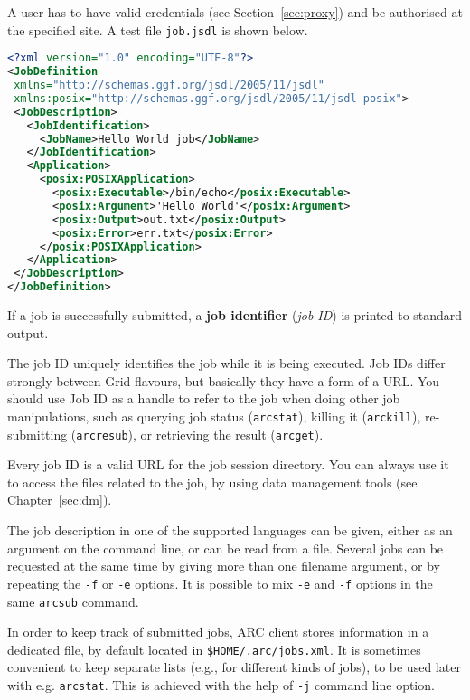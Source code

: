 A user has to have valid credentials (see Section~\ref{sec:proxy}) and be authorised at the specified site. A test file \texttt{job.jsdl} is shown below.

\begin{lstlisting}[language=xml]
<?xml version="1.0" encoding="UTF-8"?>
<JobDefinition
 xmlns="http://schemas.ggf.org/jsdl/2005/11/jsdl"
 xmlns:posix="http://schemas.ggf.org/jsdl/2005/11/jsdl-posix">
 <JobDescription>
   <JobIdentification>
     <JobName>Hello World job</JobName>
   </JobIdentification>
   <Application>
     <posix:POSIXApplication>
       <posix:Executable>/bin/echo</posix:Executable>
       <posix:Argument>'Hello World'</posix:Argument>
       <posix:Output>out.txt</posix:Output>
       <posix:Error>err.txt</posix:Error>
     </posix:POSIXApplication>
   </Application>
 </JobDescription>
</JobDefinition>
\end{lstlisting}

\begin{framed}
   If a job is successfully submitted, a \textbf{job identifier}
   (\textit{job ID}) is printed to standard output.
\end{framed}

The job ID uniquely identifies the job while it is being executed. Job IDs
differ strongly between Grid flavours, but basically they have a form of a URL.
You should use Job ID as a handle to refer to the job when doing other
job manipulations, such as querying job status (\verb#arcstat#),
killing it (\verb#arckill#), re-submitting (\verb#arcresub#), or
retrieving the result (\verb#arcget#).

\begin{framed}
   Every job ID is a valid URL for the job session directory. You can
   always use it to access the files related to the job, by using data
   management tools (see Chapter~\ref{sec:dm}).
\end{framed}

The job description in one of the supported languages can be given, either as an
argument on the command line, or can be read from a file. Several jobs can be
requested at the same time by giving more than one filename argument, or by
repeating the \verb#-f# or \verb#-e# options. It is possible to mix \verb#-e#
and \verb#-f# options in the same \texttt{arcsub} command.

In order to keep track of submitted jobs, ARC client stores information in a
dedicated file, by default located in \texttt{{\$}HOME/.arc/jobs.xml}. It is
sometimes convenient to keep separate lists (e.g., for different kinds of jobs),
to be used later with e.g. \verb#arcstat#. This is achieved with the help of
\verb#-j# command line option.

